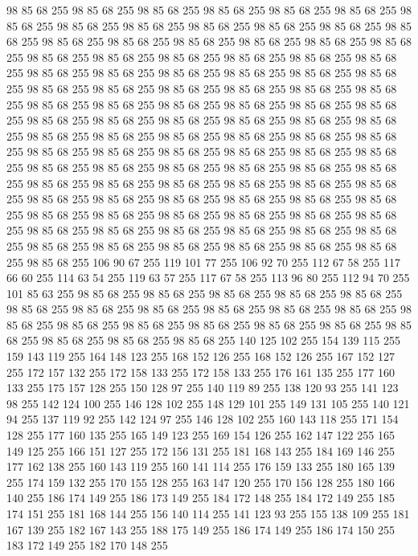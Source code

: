 98 85 68 255 98 85 68 255 98 85 68 255 98 85 68 255 98 85 68 255 98 85 68 255 98 85 68 255 98 85 68 255 98 85 68 255 98 85 68 255 98 85 68 255 98 85 68 255 98 85 68 255 98 85 68 255 98 85 68 255 98 85 68 255 98 85 68 255 98 85 68 255 98 85 68 255 98 85 68 255 98 85 68 255 98 85 68 255 98 85 68 255 98 85 68 255 98 85 68 255 98 85 68 255 98 85 68 255 98 85 68 255 98 85 68 255 98 85 68 255 98 85 68 255 98 85 68 255 98 85 68 255 98 85 68 255 98 85 68 255 98 85 68 255 98 85 68 255 98 85 68 255 98 85 68 255 98 85 68 255 98 85 68 255 98 85 68 255 98 85 68 255 98 85 68 255 98 85 68 255 98 85 68 255 98 85 68 255 98 85 68 255 98 85 68 255 98 85 68 255 98 85 68 255 98 85 68 255 98 85 68 255 98 85 68 255 98 85 68 255 98 85 68 255 98 85 68 255 98 85 68 255 98 85 68 255 98 85 68 255 98 85 68 255 98 85 68 255 98 85 68 255 98 85 68 255
98 85 68 255 98 85 68 255 98 85 68 255 98 85 68 255 98 85 68 255 98 85 68 255 98 85 68 255 98 85 68 255 98 85 68 255 98 85 68 255 98 85 68 255 98 85 68 255 98 85 68 255 98 85 68 255 98 85 68 255 98 85 68 255 98 85 68 255 98 85 68 255 98 85 68 255 98 85 68 255 98 85 68 255 98 85 68 255 98 85 68 255 98 85 68 255 98 85 68 255 98 85 68 255 98 85 68 255 98 85 68 255 98 85 68 255 98 85 68 255 98 85 68 255 98 85 68 255 98 85 68 255 98 85 68 255 106 90 67 255 119 101 77 255 106 92 70 255 112 67 58 255 117 66 60 255 114 63 54 255 119 63 57 255 117 67 58 255 113 96 80 255 112 94 70 255 101 85 63 255 98 85 68 255 98 85 68 255 98 85 68 255 98 85 68 255 98 85 68 255 98 85 68 255 98 85 68 255 98 85 68 255 98 85 68 255 98 85 68 255 98 85 68 255 98 85 68 255 98 85 68 255 98 85 68 255 98 85 68 255 98 85 68 255 98 85 68 255 98 85 68 255 98 85 68 255
98 85 68 255 98 85 68 255 140 125 102 255 154 139 115 255 159 143 119 255 164 148 123 255 168 152 126 255 168 152 126 255 167 152 127 255 172 157 132 255 172 158 133 255 172 158 133 255 176 161 135 255 177 160 133 255 175 157 128 255 150 128 97 255 140 119 89 255 138 120 93 255 141 123 98 255 142 124 100 255 146 128 102 255 148 129 101 255 149 131 105 255 140 121 94 255 137 119 92 255 142 124 97 255 146 128 102 255 160 143 118 255 171 154 128 255 177 160 135 255 165 149 123 255 169 154 126 255 162 147 122 255 165 149 125 255 166 151 127 255 172 156 131 255 181 168 143 255 184 169 146 255 177 162 138 255 160 143 119 255 160 141 114 255 176 159 133 255 180 165 139 255 174 159 132 255 170 155 128 255 163 147 120 255 170 156 128 255 180 166 140 255 186 174 149 255 186 173 149 255 184 172 148 255 184 172 149 255 185 174 151 255 181 168 144 255 156 140 114 255 141 123 93 255 155 138 109 255 181 167 139 255 182 167 143 255 188 175 149 255 186 174 149 255 186 174 150 255 183 172 149 255 182 170 148 255
